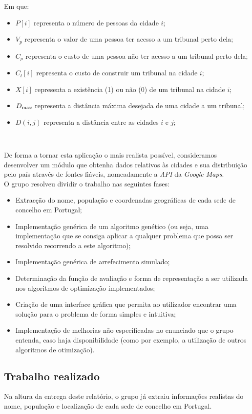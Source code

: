 \documentclass[11pt,a4paper,reqno]{article}
\numberwithin{equation}{section}
\begin{document}
	
Em que:
\begin{itemize}
\item $P[i]$ representa o número de pessoas da cidade $i$;
\item $V_p$ representa o valor de uma pessoa ter acesso a um tribunal perto dela;
\item $C_p$ representa o custo de uma pessoa não ter acesso a um tribunal perto dela;
\item $C_t [i]$ representa o custo de construir um tribunal na cidade $i$;
\item $X[i]$ representa a existência (1) ou não (0) de um tribunal na cidade $i$;
\item $D\textsubscript{max}$ representa a distância máxima desejada de uma cidade a um tribunal;
\item $D(i, j)$ representa a distância entre as cidades $i$ e $j$;
\end{itemize} 

\ 

De forma a tornar esta aplicação o mais realista possível, consideramos desenvolver um módulo que obtenha dados relativos às cidades e sua distribuição pelo país através de fontes fiáveis, nomeadamente a \textit{API} da \textit{Google Maps}.\\ 

O grupo resolveu dividir o trabalho nas seguintes fases:
\begin{itemize}
\item Extracção do nome, população e coordenadas geográficas de cada sede de concelho em Portugal;
\item Implementação genérica de um algoritmo genético (ou seja, uma implementação que se consiga aplicar a qualquer problema que possa ser resolvido recorrendo a este algoritmo);
\item Implementação genérica de arrefecimento simulado;
\item Determinação da função de avaliação e forma de representação a ser utilizada nos algoritmos de optimização implementados;
\item Criação de uma interface gráfica que permita ao utilizador encontrar uma solução para o problema de forma simples e intuitiva;
\item Implementação de melhorias não especificadas no enunciado que o grupo entenda, caso haja disponibilidade (como por exemplo, a utilização de outros algoritmos de otimização).
\end{itemize}


\subsection{Trabalho realizado}
Na altura da entrega deste relatório, o grupo já extraiu informações realistas do nome, população e localização de cada sede de concelho em Portugal.
\end{document}
